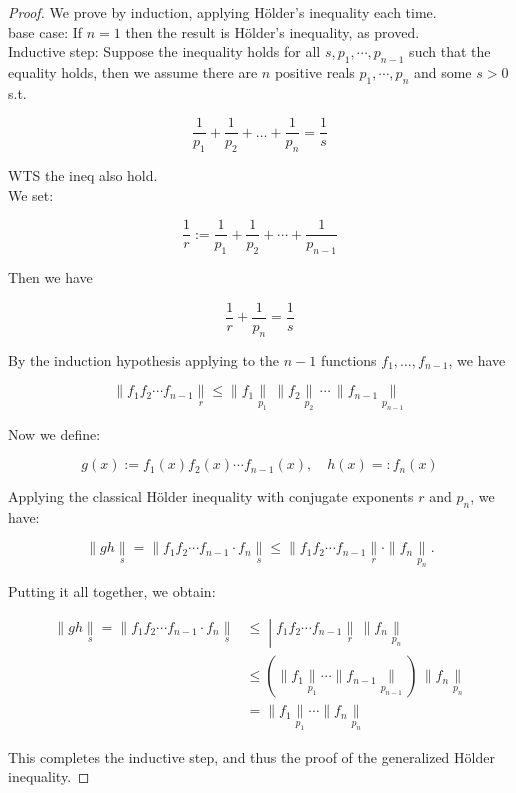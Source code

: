 \documentclass{qlnotes-export}
\begin{document}
\begin{proof}

We prove by induction, applying Hölder's inequality each time.\\
base case: If \(n = 1\) then the result is Hölder's inequality, as proved.\\
Inductive step: Suppose the inequality holds for all \(s,p_{1},\cdots,p_{n - 1}\) such that the equality holds, then we assume there are \(n\) positive reals \(p_{1},\cdots,p_{n}\) and some \(s > 0\) s.t.

\[\frac{1}{p_{1}} + \frac{1}{p_{2}} + \ldots + \frac{1}{p_{n}} = \frac{1}{s}\]

WTS the ineq also hold.\\
We set:

\[\frac{1}{r} := \frac{1}{p_{1}} + \frac{1}{p_{2}} + \cdots + \frac{1}{p_{n - 1}}\]

Then we have

\[\frac{1}{r} + \frac{1}{p_{n}} = \frac{1}{s}\]

By the induction hypothesis applying to the \(n - 1\) functions \(f_{1},\ldots,f_{n - 1}\), we have

\[\parallel f_{1}f_{2}\cdots f_{n - 1}\underset{r}{\parallel} \leq \parallel f_{1}\underset{p_{1}}{\parallel}\, \parallel f_{2}\underset{p_{2}}{\parallel}\,\cdots\, \parallel f_{n - 1}\underset{p_{n - 1}}{\parallel}\]

Now we define:

\[g(x) := f_{1}(x)f_{2}(x)\cdots f_{n - 1}(x),\quad h(x) = :f_{n}(x)\]

Applying the classical Hölder inequality with conjugate exponents \(r\) and \(p_{n}\), we have:

\[\parallel gh\underset{s}{\parallel} = \parallel f_{1}f_{2}\cdots f_{n - 1} \cdot f_{n}\underset{s}{\parallel} \leq \parallel f_{1}f_{2}\cdots f_{n - 1}\underset{r}{\parallel} \cdot \parallel f_{n}\underset{p_{n}}{\parallel}.\]

Putting it all together, we obtain:

\[\begin{matrix}
{\parallel gh\underset{s}{\parallel} = \parallel f_{1}f_{2}\cdots f_{n - 1} \cdot f_{n}\underset{s}{\parallel}} & \left. \leq \middle| f_{1}f_{2}\cdots f_{n - 1}\underset{r}{\parallel}\, \parallel f_{n}\underset{p_{n}}{\parallel} \right. \\
 & {\leq ( \parallel f_{1}\underset{p_{1}}{\parallel}\cdots \parallel f_{n - 1}\underset{p_{n - 1}}{\parallel})\, \parallel f_{n}\underset{p_{n}}{\parallel}} \\
 & {= \parallel f_{1}\underset{p_{1}}{\parallel}\cdots \parallel f_{n}\underset{p_{n}}{\parallel}}
\end{matrix}\]

This completes the inductive step, and thus the proof of the generalized Hölder inequality.

\end{proof}
\end{document}
